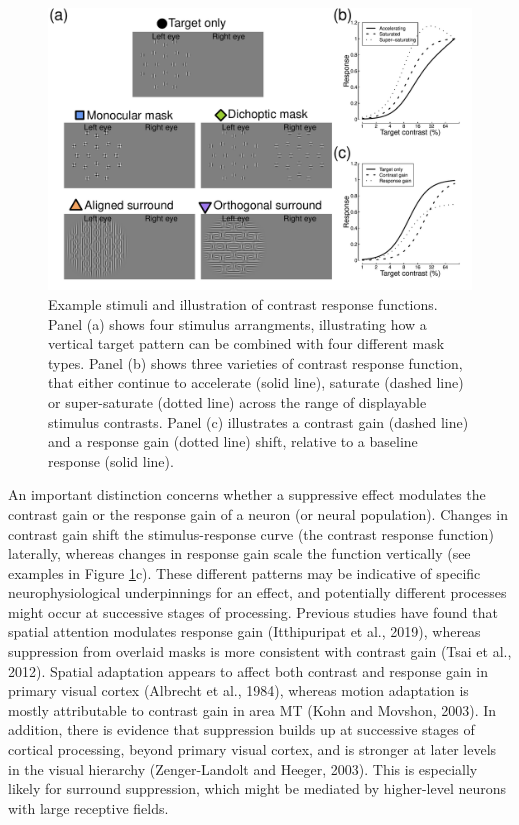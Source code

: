 \documentclass[]{article}
\begin{document}
\begin{figure}

{\centering \includegraphics{figures/stimfig} 

}

\caption{Example stimuli and illustration of contrast response functions. Panel (a) shows four stimulus arrangments, illustrating how a vertical target pattern can be combined with four different mask types. Panel (b) shows three varieties of contrast response function, that either continue to accelerate (solid line), saturate (dashed line) or super-saturate (dotted line) across the range of displayable stimulus contrasts. Panel (c) illustrates a contrast gain (dashed line) and a response gain (dotted line) shift, relative to a baseline response (solid line).}\label{fig:stimfig}
\end{figure}

An important distinction concerns whether a suppressive effect modulates the contrast gain or the response gain of a neuron (or neural population). Changes in contrast gain shift the stimulus-response curve (the contrast response function) laterally, whereas changes in response gain scale the function vertically (see examples in Figure \ref{fig:stimfig}c). These different patterns may be indicative of specific neurophysiological underpinnings for an effect, and potentially different processes might occur at successive stages of processing. Previous studies have found that spatial attention modulates response gain (Itthipuripat et al., 2019), whereas suppression from overlaid masks is more consistent with contrast gain (Tsai et al., 2012). Spatial adaptation appears to affect both contrast and response gain in primary visual cortex (Albrecht et al., 1984), whereas motion adaptation is mostly attributable to contrast gain in area MT (Kohn and Movshon, 2003). In addition, there is evidence that suppression builds up at successive stages of cortical processing, beyond primary visual cortex, and is stronger at later levels in the visual hierarchy (Zenger-Landolt and Heeger, 2003). This is especially likely for surround suppression, which might be mediated by higher-level neurons with large receptive fields.
\end{document}
